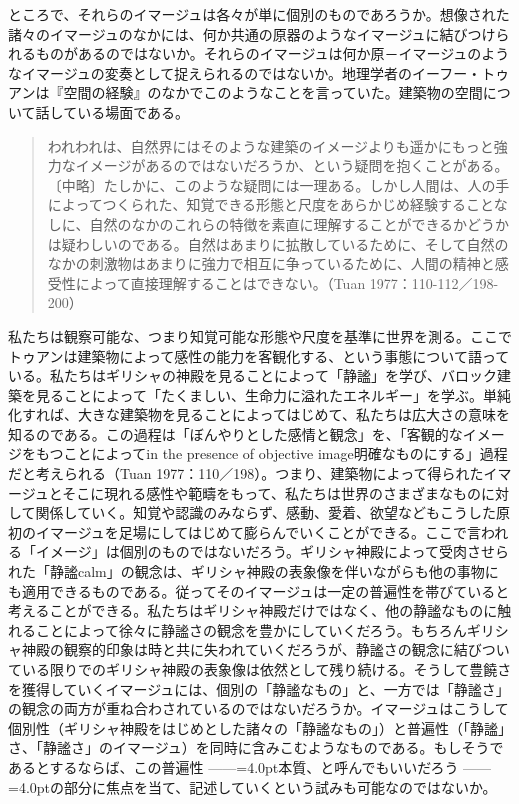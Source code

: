 \documentclass[b5j,twoside,twocolumn]{utarticle}
\begin{document}
ところで、それらのイマージュは各々が単に個別のものであろうか。想像された諸々のイマージュのなかには、何か共通の原器のようなイマージュに結びつけられるものがあるのではないか。それらのイマージュは何か原－イマージュのようなイマージュの変奏として捉えられるのではないか。地理学者のイーフー・トゥアンは『空間の経験』のなかでこのようなことを言っていた。建築物の空間について話している場面である。
\begin{quote}
われわれは、自然界にはそのような建築のイメージよりも遥かにもっと強力なイメージがあるのではないだろうか、という疑問を抱くことがある。〔中略〕たしかに、このような疑問には一理ある。しかし人間は、人の手によってつくられた、知覚できる形態と尺度をあらかじめ経験することなしに、自然のなかのこれらの特徴を素直に理解することができるかどうかは疑わしいのである。自然はあまりに拡散しているために、そして自然のなかの刺激物はあまりに強力で相互に争っているために、人間の精神と感受性によって直接理解することはできない。（Tuan 1977：110-112／198-200）
\end{quote}


私たちは観察可能な、つまり知覚可能な形態や尺度を基準に世界を測る。ここでトゥアンは建築物によって感性の能力を客観化する、という事態について語っている。私たちはギリシャの神殿を見ることによって「静謐」を学び、バロック建築を見ることによって「たくましい、生命力に溢れたエネルギー」を学ぶ。単純化すれば、大きな建築物を見ることによってはじめて、私たちは広大さの意味を知るのである。この過程は「ぼんやりとした感情と観念」を、「客観的なイメージをもつことによってin the presence of objective image明確なものにする」過程だと考えられる（Tuan 1977：110／198）。つまり、建築物によって得られたイマージュとそこに現れる感性や範疇をもって、私たちは世界のさまざまなものに対して関係していく。知覚や認識のみならず、感動、愛着、欲望などもこうした原初のイマージュを足場にしてはじめて膨らんでいくことができる。ここで言われる「イメージ」は個別のものではないだろう。ギリシャ神殿によって受肉させられた「静謐calm」の観念は、ギリシャ神殿の表象像を伴いながらも他の事物にも適用できるものである。従ってそのイマージュは一定の普遍性を帯びていると考えることができる。私たちはギリシャ神殿だけではなく、他の静謐なものに触れることによって徐々に静謐さの観念を豊かにしていくだろう。もちろんギリシャ神殿の観察的印象は時と共に失われていくだろうが、静謐さの観念に結びついている限りでのギリシャ神殿の表象像は依然として残り続ける。そうして豊饒さを獲得していくイマージュには、個別の「静謐なもの」と、一方では「静謐さ」の観念の両方が重ね合わされているのではないだろうか。イマージュはこうして個別性（ギリシャ神殿をはじめとした諸々の「静謐なもの」）と普遍性（「静謐」さ、「静謐さ」のイマージュ）を同時に含みこむようなものである。もしそうであるとするならば、この普遍性\tbaselineshift =2.5pt ------\tbaselineshift =4.0pt本質、と呼んでもいいだろう\tbaselineshift =2.5pt ------\tbaselineshift =4.0ptの部分に焦点を当て、記述していくという試みも可能なのではないか。
\end{document}
